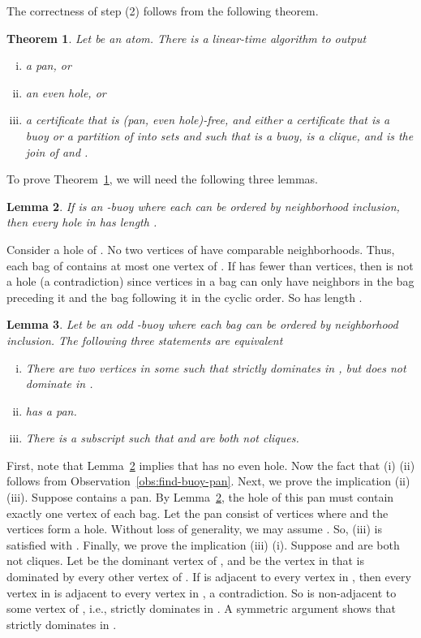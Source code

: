 \documentclass[11pt,a4paper]{article}
\newtheorem{theorem} {Theorem}[section]
\newtheorem{lemma}[theorem]{Lemma}
\newenvironment{proof}{\noindent {\it Proof:~}}{\hfill \smallskip\par}
\begin{document}
The correctness of step (2) follows from the following theorem.
\begin{theorem}\label{thm:test-atom}
Let  be an atom. There is a linear-time algorithm to output
\begin{enumerate}[(i)]
   \item a pan, or
   \item an even hole, or
   \item a certificate that  is (pan,
   even hole)-free, and  either a certificate that  is a buoy or
   a partition of  into sets  and
     such that  is a buoy,   is a clique, and  is the
   join of  and .
\end{enumerate}
\end{theorem}
To prove Theorem~\ref{thm:test-atom}, we will need the following
three lemmas.
\begin{lemma}\label{lem:buoy-length}
If  is an -buoy where each  can be ordered by
neighborhood inclusion, then every hole in  has length .
\end{lemma}
\begin{proof}
Consider a hole  of . No two vertices of  have comparable
neighborhoods. Thus, each bag of  contains at most one vertex
of . If  has fewer than  vertices, then   is not a
hole (a contradiction) since vertices in a bag can only have
neighbors in the bag preceding it and the bag following it in the
cyclic order. So  has length .
\end{proof}
\begin{lemma}\label{lem:clique}
Let  be an odd -buoy where each bag
 can be ordered by neighborhood inclusion. The following
three statements are equivalent
\begin{enumerate}[(i)]
 \item There are  two vertices  in some  such that
        strictly dominates  in , but  does not
       dominate  in .
 \item  has a pan.
 \item There is a subscript  such that  and
        are
        both not cliques.

\end{enumerate}
\end{lemma}
\begin{proof}
First, note that Lemma~\ref{lem:buoy-length} implies that  has no
even hole.  Now the fact that  (i)  (ii) follows
from Observation~\ref{obs:find-buoy-pan}. Next, we prove the
implication (ii)  (iii). Suppose  contains a
pan. By Lemma~\ref{lem:buoy-length}, the hole of this pan must
contain exactly one vertex of each bag. Let the pan consist of
vertices  where 
and the vertices  form a hole. Without loss of generality, we
may assume . So, (iii) is satisfied with .
Finally, we prove the implication (iii)  (i).
Suppose  and  are both not
cliques. Let  be the dominant vertex of , and  be the
vertex in  that is dominated by every other vertex of .
If  is adjacent to every vertex in , then every vertex in
 is adjacent to every vertex in , a contradiction. So
 is non-adjacent to some vertex of , i.e.,  strictly
dominates  in . A symmetric argument shows that  strictly
dominates  in .
\end{proof}
\end{document}
